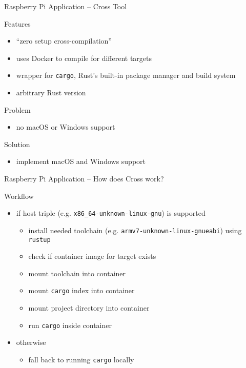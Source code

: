 \documentclass[aspectratio=1610]{beamer}
\newcommand\green[1]{{\color{green(ncs)}#1}}
\newcommand\red[1]{{\color{amaranth}#1}}
\begin{document}
  \begin{frame}{Raspberry Pi Application -- Cross Tool}
    \begin{block}{Features}
      \begin{itemize}
        \item “zero setup cross-compilation”
        \item uses Docker to compile for different targets
        \item wrapper for \texttt{cargo}, Rust's built-in package manager and build system
        \item arbitrary Rust version
      \end{itemize}
    \end{block}

     {
    \begin{block}{\red{Problem}}
      \begin{itemize}
        \item no macOS or Windows support
      \end{itemize}
    \end{block}
    }

     {
    \begin{block}{\green{Solution}}
      \begin{itemize}
        \item implement macOS and Windows support
      \end{itemize}
    \end{block}
    }
  \end{frame}

  \begin{frame}{Raspberry Pi Application -- How does Cross work?}
    \begin{block}{Workflow}
       \begin{itemize}
         \item if host triple (e.g. \texttt{x86\_64-unknown-linux-gnu}) is supported
           \begin{itemize}
            \item install needed toolchain (e.g. \texttt{armv7-unknown-linux-gnueabi}) using \texttt{rustup}
            \item check if container image for target exists
            \item mount toolchain into container
            \item mount \texttt{cargo} index into container
            \item mount project directory into container
            \item run \texttt{cargo} inside container
           \end{itemize}
         \item otherwise
           \begin{itemize}
             \item fall back to running \texttt{cargo} locally
           \end{itemize}
      \end{itemize}
    \end{block}
  \end{frame}
\end{document}
